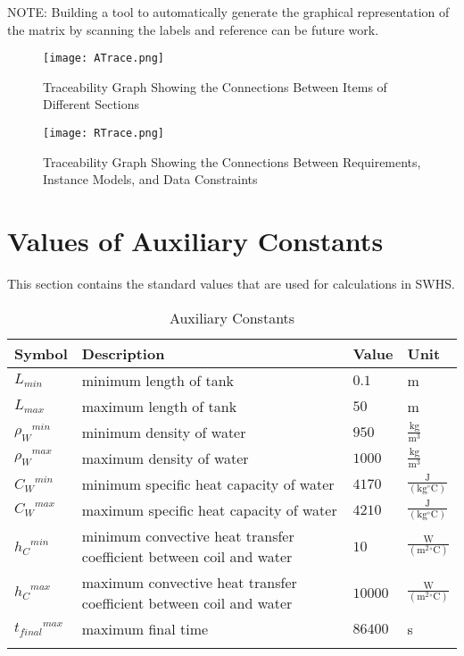 \documentclass[12pt]{article}
\begin{document}
NOTE: Building a tool to automatically generate the graphical representation of the matrix by scanning the labels and reference can be future work.
\begin{figure}
\begin{center}
\texttt{[image: ATrace.png]}
\caption{Traceability Graph Showing the Connections Between Items of Different Sections}
\label{Figure:TraceA}
\end{center}
\end{figure}
\begin{figure}
\begin{center}
\texttt{[image: RTrace.png]}
\caption{Traceability Graph Showing the Connections Between Requirements, Instance Models, and Data Constraints}
\label{Figure:TraceR}
\end{center}
\end{figure}
\section{Values of Auxiliary Constants}
\label{Sec:AuxConstants}
This section contains the standard values that are used for calculations in SWHS.
\begin{longtabu}{l X[l] l l}
\toprule
Symbol & Description & Value & Unit
\\
\midrule
${L_{min}}$ & minimum length of tank & $0.1$ & m
\\
${L_{max}}$ & maximum length of tank & $50$ & m
\\
${{ρ_{W}}^{min}}$ & minimum density of water & $950$ & $\frac{\text{kg}}{\text{m}^{3}}$
\\
${{ρ_{W}}^{max}}$ & maximum density of water & $1000$ & $\frac{\text{kg}}{\text{m}^{3}}$
\\
${{C_{W}}^{min}}$ & minimum specific heat capacity of water & $4170$ & $\frac{\text{J}}{(\text{kg}{}^{\circ}\text{C})}$
\\
${{C_{W}}^{max}}$ & maximum specific heat capacity of water & $4210$ & $\frac{\text{J}}{(\text{kg}{}^{\circ}\text{C})}$
\\
${{h_{C}}^{min}}$ & minimum convective heat transfer coefficient between coil and water & $10$ & $\frac{\text{W}}{(\text{m}^{2}{}^{\circ}\text{C})}$
\\
${{h_{C}}^{max}}$ & maximum convective heat transfer coefficient between coil and water & $10000$ & $\frac{\text{W}}{(\text{m}^{2}{}^{\circ}\text{C})}$
\\
${{t_{final}}^{max}}$ & maximum final time & $86400$ & s
\\
\bottomrule
\caption{Auxiliary Constants}
\label{Table:TAuxConsts}
\end{longtabu}
\end{document}
